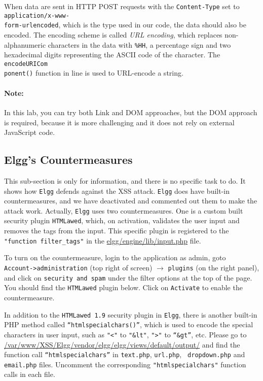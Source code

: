 When data are sent in HTTP POST requests with the {\tt Content-Type} set to {\tt
application/x-www-\\form-urlencoded}, which is the type used in our code, the data should also
be encoded. The encoding scheme is called \textit{URL encoding}, which replaces
non-alphanumeric characters in the data with {\tt \%HH}, a percentage sign and two hexadecimal
digits representing the ASCII code of the character. The {\tt encodeURICom\\ponent()} function
in line  is used to URL-encode a string.

\paragraph{Note:} In this lab, you can try both Link and DOM approaches, but the DOM approach
is required, because it is more challenging and it does not rely on external JavaScript code.




\subsection{Elgg's Countermeasures}


This sub-section is only for information, and there is no specific task to do. 
It shows how {\tt Elgg} defends against the XSS attack. 
{\tt Elgg} does have built-in countermeasures, and
we have deactivated and commented out them to make the
attack work. Actually, {\tt Elgg} uses two countermeasures. 
One is a custom built security plugin {\tt HTMLawed}, 
which, on activation, validates the user input and removes the tags from the input.
This specific plugin is registered to the {\tt "function filter\_tags"} in the
\url{elgg/engine/lib/input.php} file. 


To turn on the countermeasure, login to the application as admin, goto {\tt
Account->administration} (top right of screen) $\rightarrow$ {\tt plugins} (on the right
panel), and click on {\tt security and spam} under the filter options at the top of the page.
You should find the {\tt HTMLawed} plugin below.  Click on {\tt Activate} to enable the
countermeasure.


In addition to the {\tt HTMLawed 1.9} security plugin in {\tt Elgg}, there is another built-in
PHP method called {\tt “htmlspecialchars()”}, which is used to encode the special characters in
user input, such as {\tt "<"} to {\tt "\&lt"}, {\tt ">"} to {\tt “\&gt”}, etc.
Please go to \url{/var/www/XSS/Elgg/vendor/elgg/elgg/views/default/output/} and
find the function call {\tt “htmlspecialchars”} in {\tt text.php}, {\tt url.php}, {\tt
dropdown.php} and {\tt email.php} files. Uncomment the corresponding {\tt "htmlspecialchars"}
function calls in each file. 



